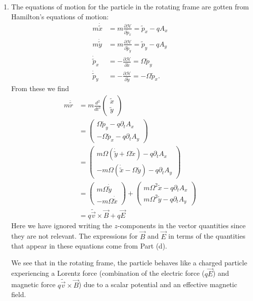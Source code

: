 \documentclass{article}
\theoremstyle{definition}
\newcommand{\p}{\partial}
\newcommand{\ham}{\mathcal{H}}
\newcommand{\f}[2]{\frac{#1}{#2}}
\begin{document}
\begin{enumerate}[label=\alph*)]
	\item The equations of motion for the particle in the rotating frame are gotten from Hamilton's equations of motion:
	\begin{align*}
		m\dot{\tilde{x}} &= m\f{\p \ham}{\p \tilde{p}_x} = \tilde{p}_x - q A_x \\ 
		m\dot{\tilde{y}} &= m\f{\p \ham}{\p \tilde{p}_y} = \tilde{p}_y - q  A_y \\
		\dot{\tilde{p}}_x &= -\f{\p \ham}{\p \tilde{x}} = \Omega \tilde{p}_y \\
		\dot{\tilde{p}}_y &= -\f{\p \ham}{\p \tilde{y}} = -\Omega \tilde{p}_x.
	\end{align*}
	From these we find 
	\begin{align*}
	m\ddot{\tilde{r}} 
	&= 	m\f{d^2}{dt^2} \begin{pmatrix}
			\tilde{x} \\ \tilde{y}
		\end{pmatrix}\\
	&= \begin{pmatrix}
		\Omega \tilde{p}_y - q\p_t A_x\\
		-\Omega \tilde{p}_x - q\p_t A_y
	\end{pmatrix}\\
	&= \begin{pmatrix}
		m\Omega (\dot{\tilde{y}} + \Omega \tilde{x}) - q \p_t A_x \\ 
		-m\Omega(\dot{\tilde{x}} - \Omega \tilde{y}) -q \p_t A_y
	\end{pmatrix} \\
	&= \begin{pmatrix}
		m\Omega \dot{\tilde{y}} \\ -m\Omega \dot{\tilde{x}}
	\end{pmatrix}
	+ \begin{pmatrix}
		m\Omega^2 \tilde{x} - q\p_t A_x \\ m\Omega^2 \tilde{y} - q \p_t A_y
	\end{pmatrix}\\
	&= q \tilde{\vec{v}} \times \vec{B} + q \vec{E}
	\end{align*}
	Here we have ignored writing the $z$-components in the vector quantities since they are not relevant. The expressions for $\vec{B}$ and $\vec{E}$ in terms of the quantities that appear in these equations come from Part (d). 
	
	
	We see that in the rotating frame, the particle behaves like a charged particle experiencing a Lorentz force (combination of the electric force ($q\vec{E}$) and magnetic force $q\tilde{\vec{v}} \times \vec{B}$) due to a scalar potential and an effective magnetic field. 
	
	
\end{enumerate}
\end{document}
